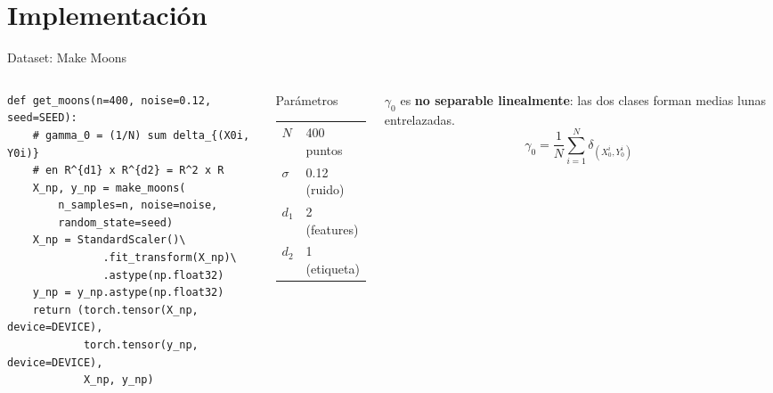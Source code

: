 \documentclass[10pt]{beamer}
\begin{document}
\section{Implementación}

\begin{frame}[fragile]{Dataset: Make Moons}

\begin{columns}
\begin{lstlisting}[style=python]
def get_moons(n=400, noise=0.12, seed=SEED):
    # gamma_0 = (1/N) sum delta_{(X0i, Y0i)}
    # en R^{d1} x R^{d2} = R^2 x R
    X_np, y_np = make_moons(
        n_samples=n, noise=noise,
        random_state=seed)
    X_np = StandardScaler()\
               .fit_transform(X_np)\
               .astype(np.float32)
    y_np = y_np.astype(np.float32)
    return (torch.tensor(X_np, device=DEVICE),
            torch.tensor(y_np, device=DEVICE),
            X_np, y_np)
\end{lstlisting}

\begin{block}{Parámetros}
  \begin{tabular}{ll}
    $N$ & 400 puntos \\
    $\sigma$ & 0.12 (ruido) \\
    $d_1$ & 2 (features) \\
    $d_2$ & 1 (etiqueta) \\
  \end{tabular}
\end{block}
\medskip
$\gamma_0$ es \textbf{no separable linealmente}: las dos clases forman medias lunas entrelazadas.
\medskip\\
\[
  \gamma_0 = \frac{1}{N}\sum_{i=1}^N\delta_{(X_0^i,Y_0^i)}
\]
\end{columns}
\end{frame}
\end{document}
